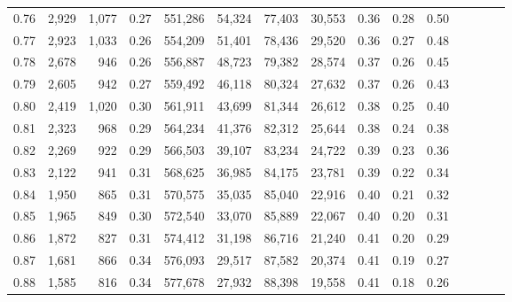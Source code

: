 \begin{tabular}{rrrcrrrrrrrrrrr}
0.76 &   2,929 &   1,077 &                                       0.27 &  551,286 &   54,324 &   77,403 &   30,553 &  0.36 &  0.28 &                         0.50 \\
0.77 &   2,923 &   1,033 &                                       0.26 &  554,209 &   51,401 &   78,436 &   29,520 &  0.36 &  0.27 &                         0.48 \\
0.78 &   2,678 &     946 &                                       0.26 &  556,887 &   48,723 &   79,382 &   28,574 &  0.37 &  0.26 &                         0.45 \\
0.79 &   2,605 &     942 &                                       0.27 &  559,492 &   46,118 &   80,324 &   27,632 &  0.37 &  0.26 &                         0.43 \\
0.80 &   2,419 &   1,020 &                                       0.30 &  561,911 &   43,699 &   81,344 &   26,612 &  0.38 &  0.25 &                         0.40 \\
0.81 &   2,323 &     968 &                                       0.29 &  564,234 &   41,376 &   82,312 &   25,644 &  0.38 &  0.24 &                         0.38 \\
0.82 &   2,269 &     922 &                                       0.29 &  566,503 &   39,107 &   83,234 &   24,722 &  0.39 &  0.23 &                         0.36 \\
0.83 &   2,122 &     941 &                                       0.31 &  568,625 &   36,985 &   84,175 &   23,781 &  0.39 &  0.22 &                         0.34 \\
0.84 &   1,950 &     865 &                                       0.31 &  570,575 &   35,035 &   85,040 &   22,916 &  0.40 &  0.21 &                         0.32 \\
0.85 &   1,965 &     849 &                                       0.30 &  572,540 &   33,070 &   85,889 &   22,067 &  0.40 &  0.20 &                         0.31 \\
0.86 &   1,872 &     827 &                                       0.31 &  574,412 &   31,198 &   86,716 &   21,240 &  0.41 &  0.20 &                         0.29 \\
0.87 &   1,681 &     866 &                                       0.34 &  576,093 &   29,517 &   87,582 &   20,374 &  0.41 &  0.19 &                         0.27 \\
0.88 &   1,585 &     816 &                                       0.34 &  577,678 &   27,932 &   88,398 &   19,558 &  0.41 &  0.18 &                         0.26 \\

\end{tabular}
